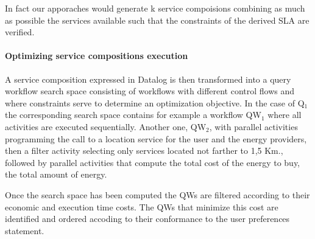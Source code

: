   In fact our apporaches would generate k service compoisions combining as much as possible the services available such that the constraints of the derived SLA are verified. 
 
    \paragraph{Optimizing service compositions execution} 
    A service composition expressed in Datalog is then transformed into a query workflow search space consisting of workflows with different control flows and where constraints serve to determine an optimization objective. In the case of {\sf Q$_1$} the corresponding search space contains for example a workflow {\sf QW$_1$} where all activities are executed sequentially. Another one, {\sf QW$_2$}, with parallel activities programming the call to a location service for the user and the energy providers, then a filter activity selecting only services located not farther to 1,5 Km., followed by  parallel activities that compute the total cost of the energy to buy, the total amount of energy. 
    
    Once the search space has been computed the QWs are filtered according to their economic and execution time costs. The QWs that minimize this cost are identified and ordered accoding to their conformance to the user preferences statement.
   
